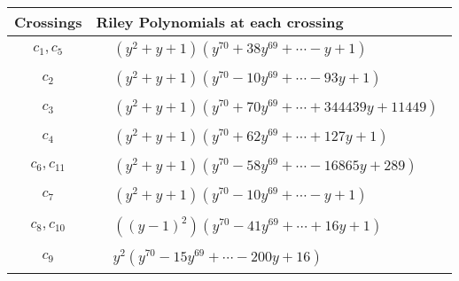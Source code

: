 \documentclass[1p]{elsarticle_modified}
\theoremstyle{definition}
\begin{document}
\begin{tabular}{m{50pt}|m{274pt}}
Crossings & \hspace{64pt}Riley Polynomials at each crossing \\
\hline $$\begin{aligned}c_{1},c_{5}\end{aligned}$$&$\begin{aligned}
&(y^2+y+1)(y^{70}+38 y^{69}+\cdots- y+1)
\end{aligned}$\\
\hline $$\begin{aligned}c_{2}\end{aligned}$$&$\begin{aligned}
&(y^2+y+1)(y^{70}-10 y^{69}+\cdots-93 y+1)
\end{aligned}$\\
\hline $$\begin{aligned}c_{3}\end{aligned}$$&$\begin{aligned}
&(y^2+y+1)(y^{70}+70 y^{69}+\cdots+344439 y+11449)
\end{aligned}$\\
\hline $$\begin{aligned}c_{4}\end{aligned}$$&$\begin{aligned}
&(y^2+y+1)(y^{70}+62 y^{69}+\cdots+127 y+1)
\end{aligned}$\\
\hline $$\begin{aligned}c_{6},c_{11}\end{aligned}$$&$\begin{aligned}
&(y^2+y+1)(y^{70}-58 y^{69}+\cdots-16865 y+289)
\end{aligned}$\\
\hline $$\begin{aligned}c_{7}\end{aligned}$$&$\begin{aligned}
&(y^2+y+1)(y^{70}-10 y^{69}+\cdots- y+1)
\end{aligned}$\\
\hline $$\begin{aligned}c_{8},c_{10}\end{aligned}$$&$\begin{aligned}
&((y-1)^2)(y^{70}-41 y^{69}+\cdots+16 y+1)
\end{aligned}$\\
\hline $$\begin{aligned}c_{9}\end{aligned}$$&$\begin{aligned}
&y^2(y^{70}-15 y^{69}+\cdots-200 y+16)
\end{aligned}$\\
\hline
\end{tabular}
\vskip 2pc
\end{document}
